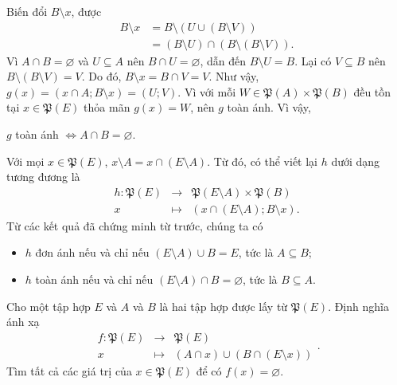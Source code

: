 Biến đổi $B \setminus x$, được
\begin{align*}
   B \setminus x &= B \setminus (U \cup (B \setminus V)) \\
   &= (B \setminus U) \cap (B \setminus (B \setminus V)).
\end{align*}
Vì $A \cap B = \varnothing$ và $U \subseteq A$ nên $B \cap U = \varnothing$, dẫn đến $B \setminus U = B$. Lại có $V \subseteq B$ nên $B \setminus (B \setminus V) = V$. Do đó, $B \setminus x = B \cap V = V$.
Như vậy, $g(x) = (x \cap A; B \setminus x) = (U; V)$. Vì với mỗi $W \in \mathfrak{P}(A) \times \mathfrak{P}(B)$ đều tồn tại $x \in \mathfrak{P}(E)$ thỏa mãn $g(x) = W$, nên $g$ toàn ánh. Vì vậy, \begin{center}
   $g$ toàn ánh $\iff A \cap B = \varnothing$.
\end{center}

\stepSubexercise Với mọi $x \in \mathfrak{P}(E)$, $x \setminus A = x \cap (E \setminus A)$. Từ đó, có thể viết lại $h$ dưới dạng tương đương là \begin{equation*}
   \begin{array}{rcl}
      h: \mathfrak{P}(E) &\to &\mathfrak{P}(E \setminus A) \times \mathfrak{P}(B) \\
      x &\mapsto &\left(x \cap (E \setminus A); B \setminus x\right).
   \end{array}
\end{equation*}
Từ các kết quả đã chứng minh từ trước, chúng ta có
\begin{itemize}
   \item $h$ đơn ánh nếu và chỉ nếu $(E \setminus A) \cup B = E$, tức là $A \subseteq B$;
   \item $h$ toàn ánh nếu và chỉ nếu $(E \setminus A) \cap B = \varnothing$, tức là $B \subseteq A$.
\end{itemize}

\exercise Cho một tập hợp $E$ và $A$ và $B$ là hai tập hợp được lấy từ $\mathfrak{P}(E)$. Định nghĩa ánh xạ $$\begin{array}{rcl}
   f: \mathfrak{P}(E) &\to &\mathfrak{P}(E) \\
   x &\mapsto &(A \cap x) \cup (B \cap (E \setminus x))
\end{array}.$$ Tìm tất cả các giá trị của $x \in \mathfrak{P}(E)$ để có $f(x) = \varnothing$.

\solution 

